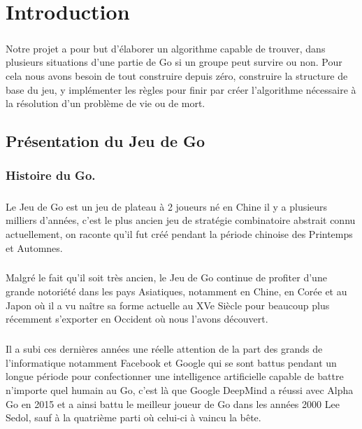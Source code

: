 \chapter{Introduction}\label{chap:introduction}
    \paragraph{}Notre projet a pour but d'élaborer un algorithme capable de trouver, dans plusieurs situations d'une partie de Go si un groupe peut survire ou non. Pour cela nous avons besoin de tout construire depuis zéro, construire la structure de base du jeu, y implémenter les règles pour finir par créer l'algorithme nécessaire à la résolution d'un problème de vie ou de mort.
    
    \section{Présentation du Jeu de Go}
        \subsection{Histoire du Go.}
            \paragraph{}Le Jeu de Go est un jeu de plateau à 2 joueurs né en Chine il y a plusieurs milliers d'années, c'est le plus ancien jeu de stratégie combinatoire abstrait connu actuellement, on raconte qu'il fut créé pendant la période chinoise des Printemps et Automnes.
            
            \paragraph{}Malgré le fait qu'il soit très ancien, le Jeu de Go continue de profiter d'une grande notoriété dans les pays Asiatiques, notamment en Chine, en Corée et au Japon où il a vu naître sa forme actuelle au XVe Siècle pour beaucoup plus récemment s'exporter en Occident où nous l'avons découvert.
            
            \paragraph{}Il a subi ces dernières années une réelle attention de la part des grands de l'informatique notamment Facebook et Google qui se sont battus pendant un longue période pour confectionner une intelligence artificielle capable de battre n'importe quel humain au Go, c'est là que Google DeepMind a réussi avec Alpha Go en 2015 et a ainsi battu le meilleur joueur de Go dans les années 2000 Lee Sedol, sauf à la quatrième parti où celui-ci à vaincu la bête.
            
